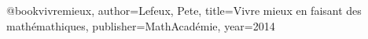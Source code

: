@book{vivremieux,
	author={Lefeux, Pete},
	title={Vivre mieux en faisant des mathémathiques},
	publisher={MathAcadémie},
	year={2014}
	}